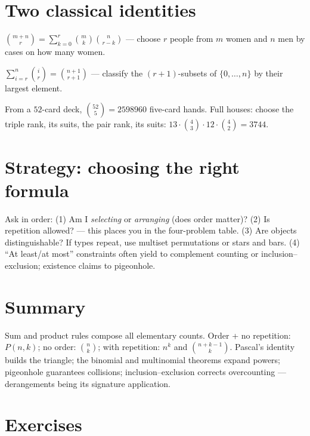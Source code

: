 \section{Two classical identities}

\begin{theorem}[Vandermonde]\label{thm:vandermonde}
$\displaystyle\binom{m+n}{r} = \sum_{k=0}^{r} \binom{m}{k}\binom{n}{r-k}$
--- choose $r$ people from $m$ women and $n$ men by cases on how many women.
\end{theorem}

\begin{theorem}\label{thm:hockey}
$\displaystyle\sum_{i=r}^{n} \binom{i}{r} = \binom{n+1}{r+1}$
--- classify the $(r+1)$-subsets of $\{0,\dots,n\}$ by their largest
element.
\end{theorem}

\begin{example}
From a $52$-card deck, $\binom{52}{5} = 2598960$ five-card hands. Full
houses: choose the triple rank, its suits, the pair rank, its suits:
$13 \cdot \binom{4}{3} \cdot 12 \cdot \binom{4}{2} = 3744$.
\end{example}

\section{Strategy: choosing the right formula}

Ask in order: (1) Am I \emph{selecting} or \emph{arranging} (does order
matter)? (2) Is repetition allowed? --- this places you in the four-problem
table. (3) Are objects distinguishable? If types repeat, use multiset
permutations or stars and bars. (4) ``At least/at most'' constraints often
yield to complement counting or inclusion--exclusion; existence claims to
pigeonhole.

\section{Summary}

Sum and product rules compose all elementary counts. Order + no repetition:
$P(n,k)$; no order: $\binom{n}{k}$; with repetition: $n^k$ and
$\binom{n+k-1}{k}$. Pascal's identity builds the triangle; the binomial and
multinomial theorems expand powers; pigeonhole guarantees collisions;
inclusion--exclusion corrects overcounting --- derangements being its
signature application.

\section*{Exercises}

